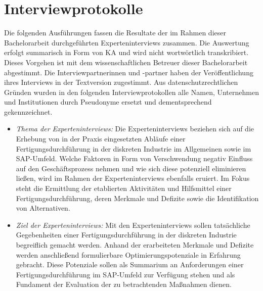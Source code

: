 \chapter{Interviewprotokolle}\label{ah:protokolle}

Die folgenden Ausführungen fassen die Resultate der im Rahmen dieser Bachelorarbeit durchgeführten Experteninterviews zusammen.
Die Auswertung erfolgt summarisch in Form von \ac{KA} und wird nicht wortwörtlich transkribiert.
Dieses Vorgehen ist mit dem wissenschaftlichen Betreuer dieser Bachelorarbeit abgestimmt.
Die Interviewpartnerinnen und -partner haben der Veröffentlichung ihres Interviews in der Textversion zugestimmt.
Aus datenschutzrechtlichen Gründen wurden in den folgenden Interviewprotokollen alle Namen, Unternehmen und Institutionen durch Pseudonyme ersetzt und dementsprechend gekennzeichnet.

\begin{itemize}
  \item
        \textit{Thema der Experteninterviews:} 
        Die Experteninterviews beziehen sich auf die Erhebung von in der Praxis eingesetzten Abläufe einer Fertigungsdurchführung in der diskreten Industrie im Allgemeinen sowie im SAP-Umfeld.
        Welche Faktoren in Form von Verschwendung negativ Einfluss auf den Geschäftsprozess nehmen und wie sich diese potenziell eliminieren ließen, wird im Rahmen der Experteninterviews ebenfalls eruiert.
        Im Fokus steht die Ermittlung der etablierten Aktivitäten und Hilfsmittel einer Fertigungsdurchführung, deren Merkmale und Defizite sowie die Identifikation von Alternativen.
  \item 
        \textit{Ziel der Experteninterviews:}
        Mit den Experteninterviews sollen tatsächliche Gegebenheiten einer Fertigungsdurchführung in der diskreten Industrie begreiflich gemacht werden. 
        Anhand der erarbeiteten Merkmale und Defizite werden anschließend formulierbare Optimierungspotenziale in Erfahrung gebracht.
        Diese Potenziale sollen als Summarium an Anforderungen einer Fertigungsdurchführung im SAP-Umfeld zur Verfügung stehen und als Fundament der Evaluation der zu betrachtenden Maßnahmen dienen.
\end{itemize}

\newpage

\newpage

\newpage
